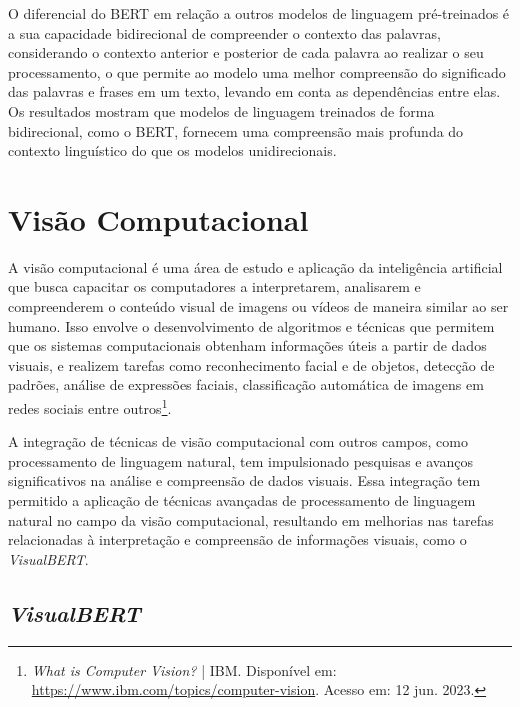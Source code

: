 O diferencial do BERT em relação a outros modelos de linguagem pré-treinados é a sua capacidade bidirecional de compreender o contexto das palavras, considerando o contexto anterior e posterior de cada palavra ao realizar o seu processamento, o que permite ao modelo uma melhor compreensão do significado das palavras e frases em um texto, levando em conta as dependências entre elas. Os resultados mostram que modelos de linguagem treinados de forma bidirecional, como o BERT, fornecem uma compreensão mais profunda do contexto linguístico do que os modelos unidirecionais.

\section{Visão Computacional}

A visão computacional é uma área de estudo e aplicação da inteligência artificial que busca capacitar os computadores a interpretarem, analisarem e compreenderem o conteúdo visual de imagens ou vídeos de maneira similar ao ser humano. Isso envolve o desenvolvimento de algoritmos e técnicas que permitem que os sistemas computacionais obtenham informações úteis a partir de dados visuais, e realizem tarefas como reconhecimento facial e de objetos, detecção de padrões, análise de expressões faciais, classificação automática de imagens em redes sociais entre outros\footnote{\textit{What is Computer Vision?} | IBM. Disponível em: \url{https://www.ibm.com/topics/computer-vision}. Acesso em: 12 jun. 2023.}.

A integração de técnicas de visão computacional com outros campos, como processamento de linguagem natural, tem impulsionado pesquisas e avanços significativos na análise e compreensão de dados visuais. Essa integração tem permitido a aplicação de técnicas avançadas de processamento de linguagem natural no campo da visão computacional, resultando em melhorias nas tarefas relacionadas à interpretação e compreensão de informações visuais, como o \textit{VisualBERT}.

\subsection{\textit{VisualBERT}}

